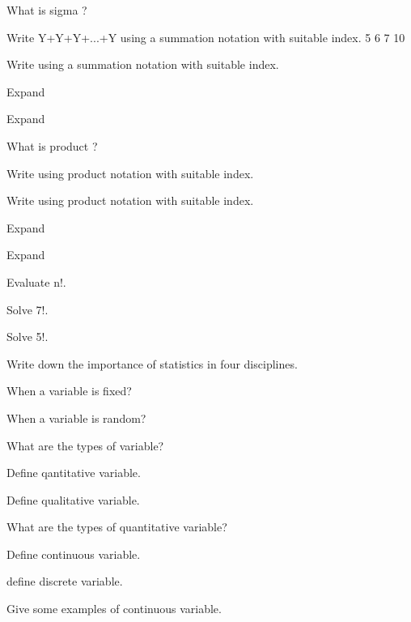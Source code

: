 \documentclass[11pt,a4paper]{article}
\begin{document}
\begin{shortlist}
\item What is sigma ?

\item Write Y+Y+Y+...+Y using a summation notation with suitable index. 5 6 7 10

\item Write using a summation notation with suitable index.

\item Expand

\item Expand

\item What is product ?

\item Write using product notation with suitable index.

\item Write using product notation with suitable index.

\item Expand

\item Expand

\item Evaluate n!.

\item Solve 7!.

\item Solve 5!.

\item Write down the importance of statistics in four disciplines.

\item When a variable is fixed?

\item When a variable is random?

\item What are the types of variable?

\item Define qantitative variable.

\item Define qualitative variable.

\item What are the types of quantitative variable?

\item Define continuous variable.

\item define discrete variable.

\item Give some examples of continuous variable.


\end{shortlist}
\end{document}
